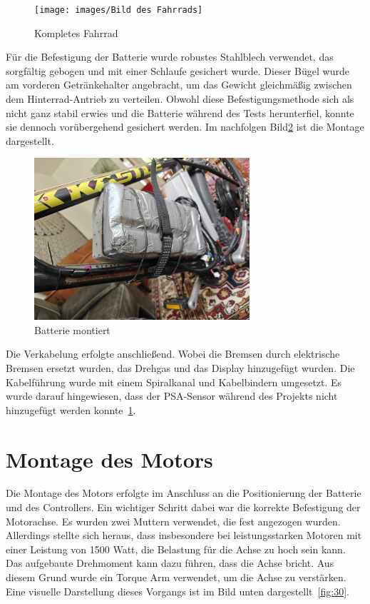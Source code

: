 \begin{figure}[h!]
    \centering
    \texttt{[image: images/Bild des Fahrrads]}
    \caption{Kompletes Fahrrad\cite{lorenz_scherrer_selbst_2023}}
    \label{fig:28}
\end{figure}


Für die Befestigung der Batterie wurde robustes Stahlblech verwendet, das sorgfältig gebogen und mit einer Schlaufe gesichert wurde.
Dieser Bügel wurde am vorderen Getränkehalter angebracht, um das Gewicht gleichmäßig zwischen dem Hinterrad-Antrieb zu verteilen.
Obwohl diese Befestigungsmethode sich als nicht ganz stabil erwies und die Batterie während des Tests herunterfiel, konnte sie dennoch vorübergehend gesichert werden.
Im nachfolgen Bild\ref{fig:29} ist die Montage dargestellt.
\begin{figure}[h!]
    \centering
    \includegraphics[width=8cm]{images/Bild der Batterie am Fahrrad}
    \caption{Batterie montiert\cite{lorenz_scherrer_selbst_2023}}
    \label{fig:29}
\end{figure}


Die Verkabelung erfolgte anschließend.
Wobei die Bremsen durch elektrische Bremsen ersetzt wurden, das Drehgas und das Display hinzugefügt wurden.
Die Kabelführung wurde mit einem Spiralkanal und Kabelbindern umgesetzt.
Es wurde darauf hingewiesen, dass der PSA-Sensor während des Projekts nicht hinzugefügt werden konnte~\ref{fig:28}.






\section{Montage des Motors}


Die Montage des Motors erfolgte im Anschluss an die Positionierung der Batterie und des Controllers. 
Ein wichtiger Schritt dabei war die korrekte Befestigung der Motorachse.
Es wurden zwei Muttern verwendet, die fest angezogen wurden. 
Allerdings stellte sich heraus, dass insbesondere bei leistungsstarken Motoren mit einer Leistung von 1500 Watt, die Belastung für die Achse zu hoch sein kann.
Das aufgebaute Drehmoment kann dazu führen, dass die Achse bricht. 
Aus diesem Grund wurde ein Torque Arm verwendet, um die Achse zu verstärken. 
Eine visuelle Darstellung dieses Vorgangs ist im Bild unten dargestellt~\ref{fig:30}.

